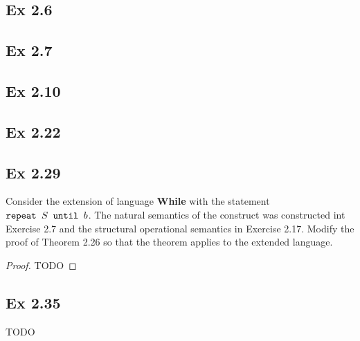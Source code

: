 
\subsection*{Ex 2.6}


\subsection*{Ex 2.7}


\subsection*{Ex 2.10}


\subsection*{Ex 2.22}


\subsection*{Ex 2.29}
Consider the extension of language \textbf{While} with the statement $\texttt{repeat } S \texttt{ until } b$. The natural semantics of the construct was constructed int Exercise 2.7 and the structural operational semantics in Exercise 2.17. Modify the proof of Theorem 2.26 so that the theorem applies to the extended language.
\begin{proof}
	TODO
\end{proof}
\subsection*{Ex 2.35}
TODO